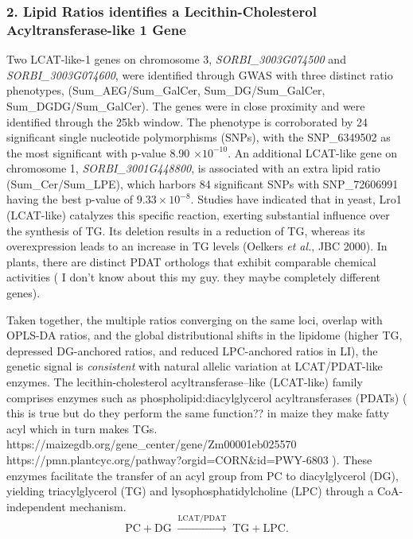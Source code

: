 \documentclass[10pt,letterpaper]{article}
\begin{document}
\begin{itemize}
\subsubsection*{2. Lipid Ratios identifies a Lecithin-Cholesterol Acyltransferase-like 1 Gene}
Two LCAT-like-1 genes on chromosome 3, \textit{SORBI\_3003G074500} and \textit{SORBI\_3003G074600}, were identified through GWAS with three distinct ratio phenotypes, (Sum\_AEG/Sum\_GalCer, Sum\_DG/Sum\_GalCer, Sum\_DGDG/Sum\_GalCer). The genes were in close proximity and were identified through the 25kb window. The phenotype is corroborated by 24 significant single nucleotide polymorphisms (SNPs), with the  SNP\_6349502 as the most significant with p-value 8.90 $\times 10^{-10}$. An additional LCAT-like gene on chromosome 1, \textit{SORBI\_3001G448800}, is associated with an extra lipid ratio (Sum\_Cer/Sum\_LPE), which harbors 84 significant SNPs with SNP\_72606991 having the best p-value of $9.33 \times 10^{-8}$. Studies have indicated that in yeast, Lro1 (LCAT-like) catalyzes this specific reaction, exerting substantial influence over the synthesis of TG. Its deletion results in a reduction of TG, whereas its overexpression leads to an increase in TG levels (Oelkers \textit{et al.}, JBC 2000). In plants, there are distinct PDAT orthologs that exhibit comparable chemical activities ( I don't know about this my guy. they maybe completely different genes). 

Taken together, the multiple ratios converging on the same loci, overlap with OPLS-DA ratios, and the global distributional shifts in the lipidome (higher TG, depressed DG-anchored ratios, and reduced LPC-anchored ratios in LI), the genetic signal is \emph{consistent} with natural allelic variation at LCAT/PDAT-like enzymes. The lecithin-cholesterol acyltransferase–like (LCAT-like) family comprises enzymes such as phospholipid:diacylglycerol acyltransferases (PDATs) ( this is true but do they perform the same function?? in maize they make fatty acyl which in turn makes TGs. https://maizegdb.org/gene_center/gene/Zm00001eb025570 https://pmn.plantcyc.org/pathway?orgid=CORN&id=PWY-6803 ). These enzymes facilitate the transfer of an acyl group from PC to diacylglycerol (DG), yielding triacylglycerol (TG) and lysophosphatidylcholine (LPC) through a CoA-independent mechanism.
\[
\text{PC} + \text{DG} \;\xrightarrow{\text{LCAT/PDAT}}\; \text{TG} + \text{LPC}.
\]




\end{itemize}
\end{document}
